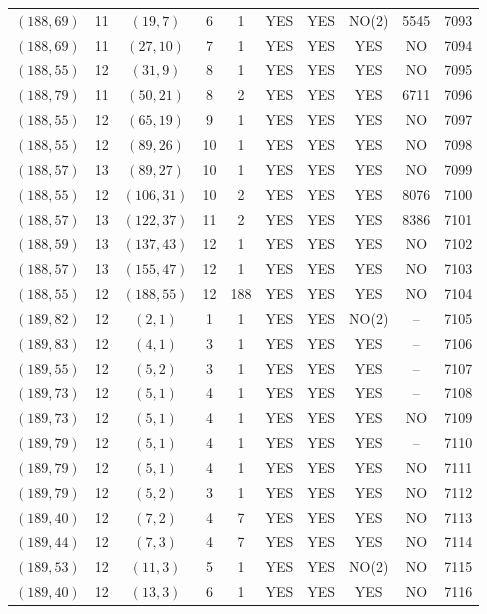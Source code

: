 \begin{longtable}{|c|c|c|c|c|c|c|c|c|c|}
$(188, 69)$ & 11 & $(19, 7)$ & 6 & 1 & YES & YES & NO(2) & 5545 & 7093\\
$(188, 69)$ & 11 & $(27, 10)$ & 7 & 1 & YES & YES & YES & NO & 7094\\
$(188, 55)$ & 12 & $(31, 9)$ & 8 & 1 & YES & YES & YES & NO & 7095\\
$(188, 79)$ & 11 & $(50, 21)$ & 8 & 2 & YES & YES & YES & 6711 & 7096\\
$(188, 55)$ & 12 & $(65, 19)$ & 9 & 1 & YES & YES & YES & NO & 7097\\
$(188, 55)$ & 12 & $(89, 26)$ & 10 & 1 & YES & YES & YES & NO & 7098\\
$(188, 57)$ & 13 & $(89, 27)$ & 10 & 1 & YES & YES & YES & NO & 7099\\
$(188, 55)$ & 12 & $(106, 31)$ & 10 & 2 & YES & YES & YES & 8076 & 7100\\
$(188, 57)$ & 13 & $(122, 37)$ & 11 & 2 & YES & YES & YES & 8386 & 7101\\
$(188, 59)$ & 13 & $(137, 43)$ & 12 & 1 & YES & YES & YES & NO & 7102\\
$(188, 57)$ & 13 & $(155, 47)$ & 12 & 1 & YES & YES & YES & NO & 7103\\
$(188, 55)$ & 12 & $(188, 55)$ & 12 & 188 & YES & YES & YES & NO & 7104\\
$(189, 82)$ & 12 & $(2, 1)$ & 1 & 1 & YES & YES & NO(2) & -- & 7105\\
$(189, 83)$ & 12 & $(4, 1)$ & 3 & 1 & YES & YES & YES & -- & 7106\\
$(189, 55)$ & 12 & $(5, 2)$ & 3 & 1 & YES & YES & YES & -- & 7107\\
$(189, 73)$ & 12 & $(5, 1)$ & 4 & 1 & YES & YES & YES & -- & 7108\\
$(189, 73)$ & 12 & $(5, 1)$ & 4 & 1 & YES & YES & YES & NO & 7109\\
$(189, 79)$ & 12 & $(5, 1)$ & 4 & 1 & YES & YES & YES & -- & 7110\\
$(189, 79)$ & 12 & $(5, 1)$ & 4 & 1 & YES & YES & YES & NO & 7111\\
$(189, 79)$ & 12 & $(5, 2)$ & 3 & 1 & YES & YES & YES & NO & 7112\\
$(189, 40)$ & 12 & $(7, 2)$ & 4 & 7 & YES & YES & YES & NO & 7113\\
$(189, 44)$ & 12 & $(7, 3)$ & 4 & 7 & YES & YES & YES & NO & 7114\\
$(189, 53)$ & 12 & $(11, 3)$ & 5 & 1 & YES & YES & NO(2) & NO & 7115\\
$(189, 40)$ & 12 & $(13, 3)$ & 6 & 1 & YES & YES & YES & NO & 7116\\

\end{longtable}
